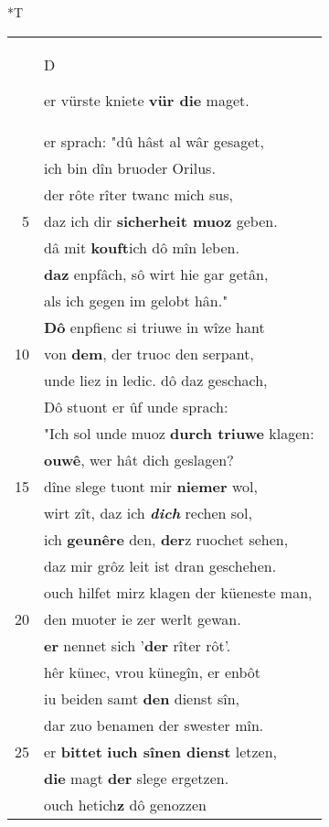 \documentclass[8pt,a4paper,notitlepage]{article}
\begin{document}
\begin{table}[ht]
\begin{minipage}[t]{0.5\linewidth}
\small
\begin{center}*T
\end{center}
\begin{tabular}{rl}
 & \begin{large}D\end{large}er vürste kniete \textbf{vür die} maget.\\ 
 & er sprach: "dû hâst al wâr gesaget,\\ 
 & ich bin dîn bruoder Orilus.\\ 
 & der rôte rîter twanc mich sus,\\ 
5 & daz ich dir \textbf{sicherheit muoz} geben.\\ 
 & dâ mit \textbf{kouft}ich dô mîn leben.\\ 
 & \textbf{daz} enpfâch, sô wirt hie gar getân,\\ 
 & als ich gegen im gelobt hân."\\ 
 & \textbf{Dô} enpfienc si triuwe in wîze hant\\ 
10 & von \textbf{dem}, der truoc den serpant,\\ 
 & unde liez in ledic. dô daz geschach,\\ 
 & Dô stuont er ûf unde sprach:\\ 
 & "Ich sol unde muoz \textbf{durch triuwe} klagen:\\ 
 & \textbf{ouwê}, wer hât dich geslagen?\\ 
15 & dîne slege tuont mir \textbf{niemer} wol,\\ 
 & wirt zît, daz ich \textit{\textbf{dich}} rechen sol,\\ 
 & ich \textbf{geunêre} den, \textbf{der}z ruochet sehen,\\ 
 & daz mir grôz leit ist dran geschehen.\\ 
 & ouch hilfet mirz klagen der küeneste man,\\ 
20 & den muoter ie zer werlt gewan.\\ 
 & \textbf{er} nennet sich '\textbf{der} rîter rôt'.\\ 
 & hêr künec, vrou künegîn, er enbôt\\ 
 & iu beiden samt \textbf{den} dienst sîn,\\ 
 & dar zuo benamen der swester mîn.\\ 
25 & er \textbf{bittet} \textbf{iuch sînen dienst} letzen,\\ 
 & \textbf{die} magt \textbf{der} slege ergetzen.\\ 
 & ouch hetich\textbf{z} dô genozzen\\ 

\end{tabular}
\end{minipage}
\end{table}
\end{document}
